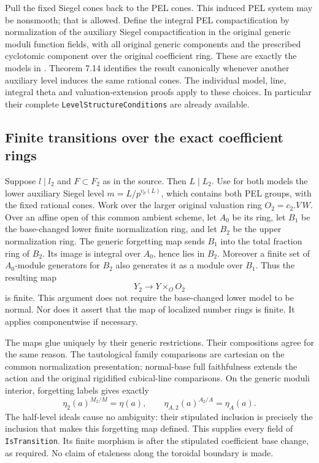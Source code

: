 Pull the fixed Siegel cones back to the PEL cones.  This induced
PEL system may be nonsmooth; that is allowed.  Define the integral
PEL compactification by normalization of the auxiliary Siegel
compactification in the original generic moduli function fields,
with all original generic components and the prescribed cyclotomic
component over the original coefficient ring.  These are exactly
the models in
\cite[(7.7)--(7.10), Theorem 7.14]{level-system-ramified}.
Theorem 7.14 identifies the result canonically whenever another
auxiliary level induces the same rational cones.  The individual
model, line, integral theta and valuation-extension proofs apply
to these choices.  In particular their complete
\texttt{LevelStructureConditions} are already available.

\subsection*{Finite transitions over the exact coefficient rings}

Suppose $l\mid l_2$ and $F\subset F_2$ as in the source.  Then
$L\mid L_2$.  Use for both models the lower auxiliary Siegel
level $m=L/p^{v_p(L)}$, which contains both PEL groups, with the
fixed rational cones.  Work over the larger original valuation ring
$O_2=c_2.V\,W$.  Over an affine open of this common ambient scheme,
let $A_0$ be its ring, let $B_1$ be the base-changed lower finite
normalization ring, and let $B_2$ be the upper normalization ring.
The generic forgetting map sends $B_1$ into the total fraction ring
of $B_2$.  Its image is integral over $A_0$, hence lies in $B_2$.
Moreover a finite set of $A_0$-module generators for $B_2$ also
generates it as a module over $B_1$.  Thus the resulting map
\[
                       Y_2\longrightarrow Y\times_O O_2
\]
is finite.  This argument does not require the base-changed lower
model to be normal.  Nor does it assert that the map of localized
number rings is finite.  It applies componentwise if necessary.

The maps glue uniquely by their generic restrictions.  Their
compositions agree for the same reason.  The tautological family
comparisons are cartesian on the common normalization presentation;
normal-base full faithfulness extends the action and the original
rigidified cubical-line comparisons.  On the generic moduli interior,
forgetting labels gives exactly
\[
             \eta_2(a)^{M_2/M}=\eta(a),\qquad
             \eta_{A,2}(a)^{A_2/A}=\eta_A(a).
\]
The half-level ideals cause no ambiguity: their stipulated inclusion
is precisely the inclusion that makes this forgetting map defined.
This supplies every field of \texttt{IsTransition}.  Its finite
morphism is after the stipulated coefficient base change, as required.
No claim of etaleness along the toroidal boundary is made.

